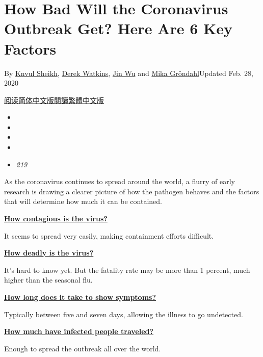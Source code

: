 \hypertarget{how-bad-will-the-coronavirus-outbreak-get-here-are-6-key-factors}{%
\section{How Bad Will the Coronavirus Outbreak Get? Here Are 6 Key
Factors}\label{how-bad-will-the-coronavirus-outbreak-get-here-are-6-key-factors}}

By \href{https://www.nytimes3xbfgragh.onion/by/knvul-sheikh}{Knvul
Sheikh},
\href{https://www.nytimes3xbfgragh.onion/by/derek-watkins}{Derek
Watkins}, \href{https://www.nytimes3xbfgragh.onion/by/jin-wu}{Jin Wu}
and \href{https://www.nytimes3xbfgragh.onion/by/mika-grondahl}{Mika
Gröndahl}Updated Feb. 28, 2020

\href{https://cn.nytimes3xbfgragh.onion/china/20200201/china-coronavirus-contain/}{阅读简体中文版}\href{https://cn.nytimes3xbfgragh.onion/china/20200201/china-coronavirus-contain/zh-hant/}{閱讀繁體中文版}

\begin{itemize}
\item
\item
\item
\item
\item
  \emph{219}
\end{itemize}

As the coronavirus continues to spread around the world, a flurry of
early research is drawing a clearer picture of how the pathogen behaves
and the factors that will determine how much it can be contained.

\protect\hyperlink{transmission}{\textbf{How contagious is the virus?}}

It seems to spread very easily, making containment efforts difficult.

\protect\hyperlink{virulence}{\textbf{How deadly is the virus?}}

It's hard to know yet. But the fatality rate may be more than 1 percent,
much higher than the seasonal flu.

\protect\hyperlink{contagiousperiod}{\textbf{How long does it take to
show symptoms?}}

Typically between five and seven days, allowing the illness to go
undetected.

\protect\hyperlink{travel}{\textbf{How much have infected people
traveled?}}

Enough to spread the outbreak all over the world.

